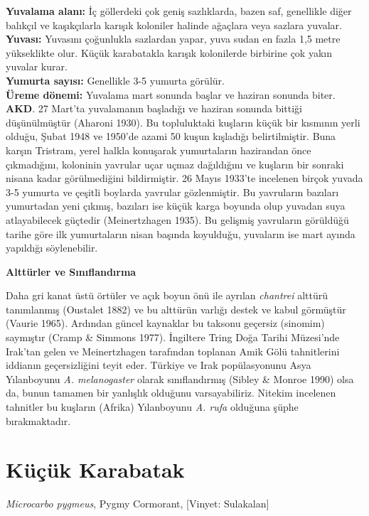 \documentclass[
  letterpaper,
  DIV=11,
  numbers=noendperiod]{scrreprt}
\begin{document}
\textbf{Yuvalama alanı:} İç göllerdeki çok geniş sazlıklarda, bazen saf,
genellikle diğer balıkçıl ve kaşıkçılarla karışık koloniler halinde
ağaçlara veya sazlara yuvalar.\\
\textbf{Yuvası:} Yuvasını çoğunlukla sazlardan yapar, yuva sudan en
fazla 1,5 metre yükseklikte olur. Küçük karabatakla karışık kolonilerde
birbirine çok yakın yuvalar kurar.\\
\textbf{Yumurta sayısı:} Genellikle 3-5 yumurta görülür.\\
\textbf{Üreme dönemi:} Yuvalama mart sonunda başlar ve haziran sonunda
biter. \textbf{AKD}. 27 Mart'ta yuvalamanın başladığı ve haziran sonunda
bittiği düşünülmüştür (Aharoni 1930). Bu topluluktaki kuşların küçük bir
kısmının yerli olduğu, Şubat 1948 ve 1950'de azami 50 kuşun kışladığı
belirtilmiştir. Buna karşın Tristram, yerel halkla konuşarak
yumurtaların hazirandan önce çıkmadığını, koloninin yavrular uçar uçmaz
dağıldığını ve kuşların bir sonraki nisana kadar görülmediğini
bildirmiştir. 26 Mayıs 1933'te incelenen birçok yuvada 3-5 yumurta ve
çeşitli boylarda yavrular gözlenmiştir. Bu yavruların bazıları
yumurtadan yeni çıkmış, bazıları ise küçük karga boyunda olup yuvadan
suya atlayabilecek güçtedir (Meinertzhagen 1935). Bu gelişmiş yavruların
görüldüğü tarihe göre ilk yumurtaların nisan başında koyulduğu,
yuvaların ise mart ayında yapıldığı söylenebilir.

\textbf{Alttürler ve Sınıflandırma}

Daha gri kanat üstü örtüler ve açık boyun önü ile ayrılan
\emph{chantrei} alttürü tanımlanmış (Oustalet 1882) ve bu alttürün
varlığı destek ve kabul görmüştür (Vaurie 1965). Ardından güncel
kaynaklar bu taksonu geçersiz (sinomim) saymıştır (Cramp \& Simmons
1977). İngiltere Tring Doğa Tarihi Müzesi'nde Irak'tan gelen ve
Meinertzhagen tarafından toplanan Amik Gölü tahnitlerini iddianın
geçersizliğini teyit eder. Türkiye ve Irak popülasyonunu Asya
Yılanboyunu \emph{A. melanogaster} olarak sınıflandırmış (Sibley \&
Monroe 1990) olsa da, bunun tamamen bir yanlışlık olduğunu
varsayabiliriz. Nitekim incelenen tahnitler bu kuşların (Afrika)
Yılanboyunu \emph{A. rufa} olduğuna şüphe bırakmaktadır.

\section{Küçük Karabatak}\label{kuxfcuxe7uxfck-karabatak}

\emph{Microcarbo pygmeus}, Pygmy Cormorant, {[}Vinyet: Sulakalan{]}
\end{document}
